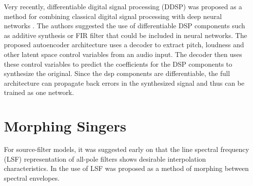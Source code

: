 Very recently, differentiable digital signal processing (DDSP) was proposed as a method for combining classical digital signal processing with deep neural networks \cite{engel_ddsp:_2020}. The authors suggested the use of differentiable DSP components such as additive synthesis or FIR filter that could be included in neural networks. The proposed autoencoder architecture uses a decoder to extract pitch, loudness and other latent space control variables from an audio input. The decoder then uses these control variables to predict the coefficients for the DSP components to synthesize the original. Since the dsp components are differentiable, the full architecture can propagate back errors in the synthesized signal and thus can be trained as one network. 


\section{Morphing Singers}

For source-filter models, it was suggested early on that the line spectral frequency (LSF)\cite{itakura_line_1975} representation of all-pole filters shows desirable interpolation characteristics. In \cite{roddy_method_2014} the use of LSF was proposed as a method of morphing between spectral envelopes. 
